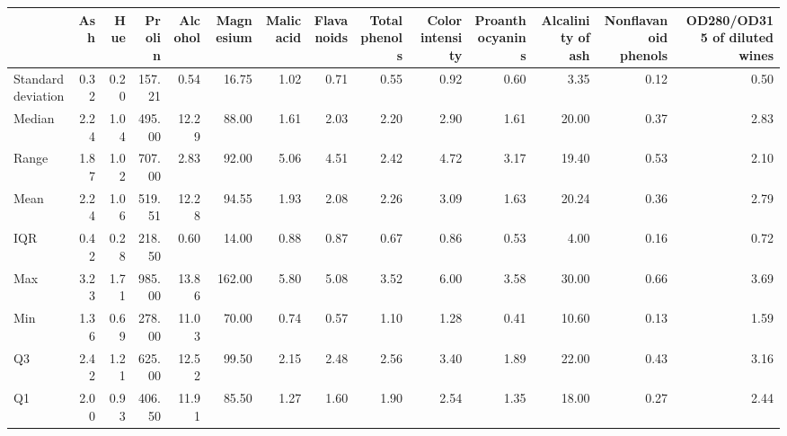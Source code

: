 \begin{tabular}{lrrrrrrrrrrrrr}
\toprule
 & Ash & Hue & Prolin & Alcohol & Magnesium & Malic acid & Flavanoids & Total phenols & Color intensity & Proanthocyanins & Alcalinity of ash & Nonflavanoid phenols & OD280/OD315 of diluted wines \\
\midrule
Standard deviation & 0.32 & 0.20 & 157.21 & 0.54 & 16.75 & 1.02 & 0.71 & 0.55 & 0.92 & 0.60 & 3.35 & 0.12 & 0.50 \\
Median & 2.24 & 1.04 & 495.00 & 12.29 & 88.00 & 1.61 & 2.03 & 2.20 & 2.90 & 1.61 & 20.00 & 0.37 & 2.83 \\
Range & 1.87 & 1.02 & 707.00 & 2.83 & 92.00 & 5.06 & 4.51 & 2.42 & 4.72 & 3.17 & 19.40 & 0.53 & 2.10 \\
Mean & 2.24 & 1.06 & 519.51 & 12.28 & 94.55 & 1.93 & 2.08 & 2.26 & 3.09 & 1.63 & 20.24 & 0.36 & 2.79 \\
IQR & 0.42 & 0.28 & 218.50 & 0.60 & 14.00 & 0.88 & 0.87 & 0.67 & 0.86 & 0.53 & 4.00 & 0.16 & 0.72 \\
Max & 3.23 & 1.71 & 985.00 & 13.86 & 162.00 & 5.80 & 5.08 & 3.52 & 6.00 & 3.58 & 30.00 & 0.66 & 3.69 \\
Min & 1.36 & 0.69 & 278.00 & 11.03 & 70.00 & 0.74 & 0.57 & 1.10 & 1.28 & 0.41 & 10.60 & 0.13 & 1.59 \\
Q3 & 2.42 & 1.21 & 625.00 & 12.52 & 99.50 & 2.15 & 2.48 & 2.56 & 3.40 & 1.89 & 22.00 & 0.43 & 3.16 \\
Q1 & 2.00 & 0.93 & 406.50 & 11.91 & 85.50 & 1.27 & 1.60 & 1.90 & 2.54 & 1.35 & 18.00 & 0.27 & 2.44 \\
\bottomrule
\end{tabular}
